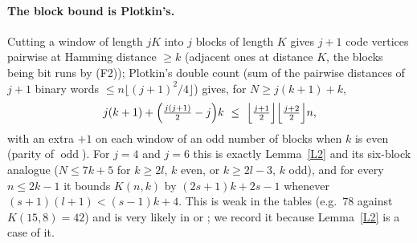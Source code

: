 \documentclass[11pt]{article}
\theoremstyle{remark}
\newcommand{\odd}{\operatorname{odd}}
\begin{document}
\paragraph{The block bound is Plotkin's.} Cutting a window of length $jK$ into $j$ blocks of length $K$ gives $j+1$ code vertices
pairwise at Hamming distance $\ge k$ (adjacent ones at distance $K$, the blocks being bit runs by (F2)); Plotkin's double count
(sum of the pairwise distances of $j+1$ binary words $\le n\lfloor (j+1)^2/4\rfloor$) gives, for $N\ge j(k+1)+k$,
\[ j(k+1)+\Bigl(\tfrac{j(j+1)}2-j\Bigr)k\ \le\ \Bigl\lfloor\tfrac{j+1}2\Bigr\rfloor\Bigl\lfloor\tfrac{j+2}2\Bigr\rfloor n , \]
with an extra $+1$ on each window of an odd number of blocks when $k$ is even (parity of $\odd$). For $j=4$ and $j=6$ this is
exactly Lemma~\ref{L2} and its six-block analogue ($N\le 7k+5$ for $k\ge 2l$, $k$ even, or $k\ge 2l-3$, $k$ odd), and for every
$n\le 2k-1$ it bounds $K(n,k)$ by $(2s+1)k+2s-1$ whenever $(s+1)(l+1)<(s-1)k+4$. This is weak in the tables
(e.g.\ $78$ against $K(15,8)=42$) and is very likely in \cite{Si} or \cite{Do}; we record it because Lemma~\ref{L2} is a case of it.
\end{document}

